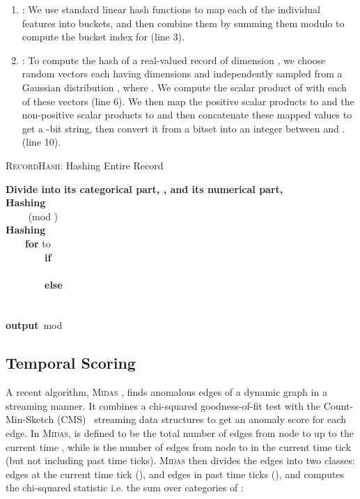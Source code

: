 \documentclass[sigconf]{acmart}
\begin{document}
\begin{enumerate}
\item : We use standard linear hash functions \cite{litwin1980linear} to map  each of the individual features  into  buckets, and then combine them by summing them modulo  to compute the bucket index  for  (line 3).


\item : To compute the hash of a real-valued record  of dimension , we choose  random vectors  each having  dimensions and independently sampled from a Gaussian distribution , where . We compute the scalar product of  with each of these vectors (line 6). We then map the positive scalar products to  and the non-positive scalar products to  and then concatenate these mapped values to get a -bit string, then convert it from a bitset into an integer  between  and . (line 10).
\end{enumerate}

\begin{algorithm}
	\caption{\textsc{RecordHash}: Hashing Entire Record  \label{alg:recordhash}}
	{\bf  Divide  into its categorical part, , and its numerical part, } \\
	{\bf  Hashing } \\
	\ \ \ \ {} (mod )  \\
	{\bf  Hashing } \\
	\ \ \ \ \textbf{for}   to   \\
	\ \ \ \ \ \ \ \	\textbf{if}   \\
	\ \ \ \ \ \ \ \ \ \ \ \  \\
	\ \ \ \ \ \ \ \ \textbf{else}  \\
	\ \ \ \ \ \ \ \ \ \ \ \  \\
	\ \ \ \   \\

    {\bf output}\ mod
\end{algorithm}



\subsection{Temporal Scoring}
\label{sec:scoring}

A recent algorithm, \textsc{Midas} \cite{bhatia2020midas}, finds anomalous edges of a dynamic graph in a streaming manner. It combines a chi-squared goodness-of-fit test with the Count-Min-Sketch (CMS)~\cite{cormode2005improved} streaming data structures to get an anomaly score for each edge. In \textsc{Midas},  is defined to be the total number of edges from node  to  up to the current time , while  is the number of edges from node  to  in the current time tick  (but not including past time ticks). \textsc{Midas} then divides the edges into two classes: edges at the current time tick  (), and edges in past time ticks (), and computes the chi-squared statistic i.e. the sum over categories of :
\end{document}
